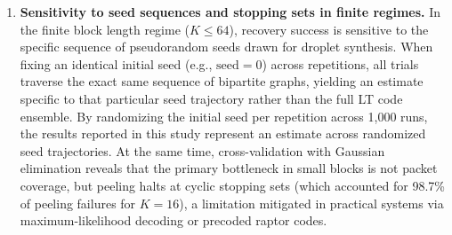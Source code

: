 \begin{enumerate}
    \item \textbf{Sensitivity to seed sequences and stopping sets in finite regimes.} In the finite block length regime ($K \le 64$), recovery success is sensitive to the specific sequence of pseudorandom seeds drawn for droplet synthesis. When fixing an identical initial seed (e.g., $\text{seed} = 0$) across repetitions, all trials traverse the exact same sequence of bipartite graphs, yielding an estimate specific to that particular seed trajectory rather than the full LT code ensemble. By randomizing the initial seed per repetition across 1,000 runs, the results reported in this study represent an estimate across randomized seed trajectories. At the same time, cross-validation with Gaussian elimination reveals that the primary bottleneck in small blocks is not packet coverage, but peeling halts at cyclic stopping sets (which accounted for 98.7\% of peeling failures for $K=16$), a limitation mitigated in practical systems via maximum-likelihood decoding or precoded raptor codes.
\end{enumerate}

